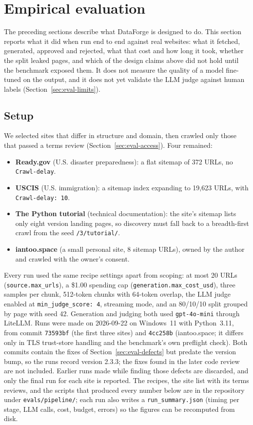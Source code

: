 \documentclass[11pt]{article}
\begin{document}
\section{Empirical evaluation}
\label{sec:eval}

The preceding sections describe what DataForge is designed to do. This
section reports what it did when run end to end against real websites:
what it fetched, generated, approved and rejected, what that cost and how
long it took, whether the split leaked pages, and which of the design
claims above did not hold until the benchmark exposed them. It does not
measure the quality of a model fine-tuned on the output, and it does not
yet validate the LLM judge against human labels
(Section~\ref{sec:eval-limits}).

\subsection{Setup}
\label{sec:eval-setup}
We selected sites that differ in structure and domain, then crawled only
those that passed a terms review (Section~\ref{sec:eval-access}). Four
remained:
\begin{itemize}[leftmargin=1.5em]
  \item \textbf{Ready.gov} (U.S. disaster preparedness): a flat sitemap
    of 372 URLs, no \texttt{Crawl-delay}.
  \item \textbf{USCIS} (U.S. immigration): a sitemap index expanding to
    19{,}623 URLs, with \texttt{Crawl-delay: 10}.
  \item \textbf{The Python tutorial} (technical documentation): the
    site's sitemap lists only eight version landing pages, so discovery
    must fall back to a breadth-first crawl from the seed
    \texttt{/3/tutorial/}.
  \item \textbf{iantoo.space} (a small personal site, 8 sitemap URLs),
    owned by the author and crawled with the owner's consent.
\end{itemize}
Every run used the same recipe settings apart from scoping: at most 20
URLs (\texttt{source.max\_urls}), a \$1.00 spending cap
(\texttt{generation.max\_cost\_usd}), three samples per chunk, 512-token chunks with 64-token overlap, the LLM
judge enabled at \texttt{min\_judge\_score: 4}, streaming mode, and an
80/10/10 split grouped by page with seed 42. Generation and judging both
used \texttt{gpt-4o-mini} through LiteLLM. Runs were made on 2026-09-22 on
Windows~11 with Python~3.11, from commit \texttt{73593bf} (the first three
sites) and \texttt{4cc258b} (iantoo.space; it differs only in TLS
trust-store handling and the benchmark's own preflight check). Both
commits contain the fixes of Section~\ref{sec:eval-defects} but predate
the version bump, so the runs record version 2.3.3; the fixes found in
the later code review are not included. Earlier runs made while finding
those defects are discarded, and only the final run for each site is
reported. The recipes,
the site list with its terms reviews, and the scripts that produced every
number below are in the repository under \texttt{evals/pipeline/}; each
run also writes a \texttt{run\_summary.json} (timing per stage, LLM calls,
cost, budget, errors) so the figures can be recomputed from disk.
\end{document}
